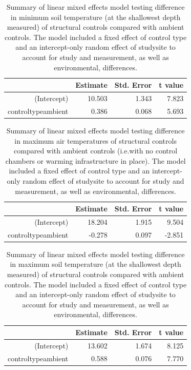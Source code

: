 \documentclass{article}
\begin{document}
\begin{table}[ht]
\centering
\begin{tabular}{rrrr}
  \hline
 & Estimate & Std. Error & t value \\ 
  \hline
(Intercept) & 10.503 & 1.343 & 7.823 \\ 
  controltypeambient & 0.386 & 0.068 & 5.693 \\ 
   \hline
\end{tabular}
\caption{Summary of linear mixed effects model testing difference in minimum soil temperature (at the shallowest depth measured) of structural controls compared with ambient controls. The model included a fixed effect of control type and an intercept-only random effect of studysite to account for study and measurement, as well as environmental, differences.} 
\end{table} 
\begin{table}[ht]
\centering
\begin{tabular}{rrrr}
  \hline
 & Estimate & Std. Error & t value \\ 
  \hline
(Intercept) & 18.204 & 1.915 & 9.504 \\ 
  controltypeambient & -0.278 & 0.097 & -2.851 \\ 
   \hline
\end{tabular}
\caption{Summary of linear mixed effects model testing difference in maximum air temperatures of structural controls compared with ambient controls (i.e.with no control chambers or warming infrastructure in place). The model included a fixed effect of control type and an intercept-only random effect of studysite to account for study and measurement, as well as environmental, differences.} 
\end{table}
\begin{table}[ht]
\centering
\begin{tabular}{rrrr}
  \hline
 & Estimate & Std. Error & t value \\ 
  \hline
(Intercept) & 13.602 & 1.674 & 8.125 \\ 
  controltypeambient & 0.588 & 0.076 & 7.770 \\ 
   \hline
\end{tabular}
\caption{Summary of linear mixed effects model testing difference in maximum soil temperature (at the shallowest depth measured) of structural controls compared with ambient controls. The model included a fixed effect of control type and an intercept-only random effect of studysite to account for study and measurement, as well as environmental, differences.} 
\end{table}
\end{document}

